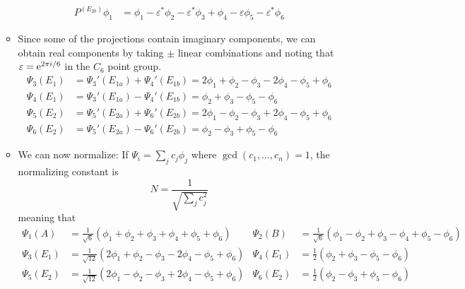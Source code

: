 \documentclass[../notes.tex]{subfiles}
\begin{document}
\begin{itemize}
\begin{itemize}
\begin{align*}
            P^{(E_{2b})}\phi_1 &= \phi_1-\varepsilon^*\phi_2-\varepsilon^*\phi_3+\phi_4-\varepsilon\phi_5  -\varepsilon^*\phi_6
        \end{align*}
        \item Since some of the projections contain imaginary components, we can obtain real components by taking $\pm$ linear combinations and noting that $\varepsilon=\e[2\pi i/6]$ in the $C_6$ point group.
        \begin{align*}
            \Psi_3(E_1) &= \Psi_3'(E_{1a})+\Psi_4'(E_{1b}) = 2\phi_1+\phi_2-\phi_3-2\phi_4-\phi_5+\phi_6\\
            \Psi_4(E_1) &= \Psi_3'(E_{1a})-\Psi_4'(E_{1b}) = \phi_2+\phi_3-\phi_5-\phi_6\\
            \Psi_5(E_2) &= \Psi_5'(E_{2a})+\Psi_6'(E_{2b}) = 2\phi_1-\phi_2-\phi_3+2\phi_4-\phi_5+\phi_6\\
            \Psi_6(E_2) &= \Psi_5'(E_{2a})-\Psi_6'(E_{2b}) = \phi_2-\phi_3+\phi_5-\phi_6
        \end{align*}
        \item We can now normalize: If $\Psi_i=\sum_jc_j\phi_j$ where $\gcd(c_1,\dots,c_n)=1$, the normalizing constant is
        \begin{equation*}
            N = \frac{1}{\sqrt{\sum_jc_j^2}}
        \end{equation*}
        meaning that
        \begin{align*}
            \Psi_1(A) &= \frac{1}{\sqrt{6}}\left( \phi_1+\phi_2+\phi_3+\phi_4+\phi_5+\phi_6 \right)&
                \Psi_2(B) &= \frac{1}{\sqrt{6}}\left( \phi_1-\phi_2+\phi_3-\phi_4+\phi_5-\phi_6 \right)\\
            \Psi_3(E_1) &= \frac{1}{\sqrt{12}}\left( 2\phi_1+\phi_2-\phi_3-2\phi_4-\phi_5+\phi_6 \right)&
                \Psi_4(E_1) &= \frac{1}{2}\left( \phi_2+\phi_3-\phi_5-\phi_6 \right)\\
            \Psi_5(E_2) &= \frac{1}{\sqrt{12}}\left( 2\phi_1-\phi_2-\phi_3+2\phi_4-\phi_5+\phi_6 \right)&
                \Psi_6(E_2) &= \frac{1}{2}\left( \phi_2-\phi_3+\phi_5-\phi_6 \right)
        \end{align*}
        \begin{figure}[h!]
            \centering
            \begin{subfigure}[b]{0.25\linewidth}
                \centering

\end{subfigure}
\end{figure}
\end{itemize}
\end{itemize}
\end{document}
